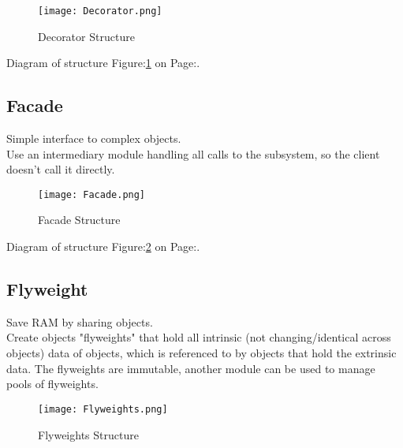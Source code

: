 \documentclass[11pt]{scrartcl} %
\begin{document}
\begin{figure}[h] %
	\centering
	\texttt{[image: Decorator.png]} %
	\caption{Decorator Structure}
	\label{Decorator Structure}
\end{figure}

Diagram of structure Figure:\ref{Decorator Structure} on Page:\pageref{Decorator Structure}.

\subsection{Facade}

Simple interface to complex objects.\\

Use an intermediary module handling all calls to the subsystem, so the client doesn't call it directly.\\

\begin{figure}[h] %
	\centering
	\texttt{[image: Facade.png]} %
	\caption{Facade Structure}
	\label{Facade Structure}
\end{figure}

Diagram of structure Figure:\ref{Facade Structure} on Page:\pageref{Facade Structure}.

\subsection{Flyweight}

Save RAM by sharing objects.\\

Create objects "flyweights" that hold all intrinsic (not changing/identical across objects) data of objects,
which is referenced to by objects that hold the extrinsic data. The flyweights are immutable, another
module can be used to manage pools of flyweights.\\

\begin{figure}[h] %
	\centering
	\texttt{[image: Flyweights.png]} %
	\caption{Flyweights Structure}
	\label{Flyweights Structure}
\end{figure}
\end{document}
